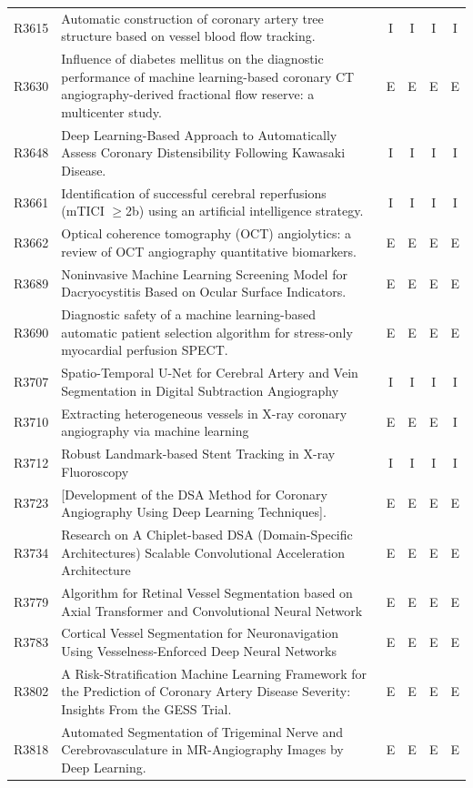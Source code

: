 \begin{longtable}{@{}l p{8.6cm} c c c c@{}}
R3615 & Automatic construction of coronary artery tree structure based on vessel blood flow tracking. & I & I & I & I \\
R3630 & Influence of diabetes mellitus on the diagnostic performance of machine learning-based coronary CT angiography-derived fractional flow reserve: a multicenter study. & E & E & E & E \\
R3648 & Deep Learning-Based Approach to Automatically Assess Coronary Distensibility Following Kawasaki Disease. & I & I & I & I \\
R3661 & Identification of successful cerebral reperfusions (mTICI $\geq$2b) using an artificial intelligence strategy. & I & I & I & I \\
R3662 & Optical coherence tomography (OCT) angiolytics: a review of OCT angiography quantitative biomarkers. & E & E & E & E \\
R3689 & Noninvasive Machine Learning Screening Model for Dacryocystitis Based on Ocular Surface Indicators. & E & E & E & E \\
R3690 & Diagnostic safety of a machine learning-based automatic patient selection algorithm for stress-only myocardial perfusion SPECT. & E & E & E & E \\
R3707 & Spatio-Temporal U-Net for Cerebral Artery and Vein Segmentation in Digital Subtraction Angiography & I & I & I & I \\
R3710 & Extracting heterogeneous vessels in X-ray coronary angiography via machine learning & E & E & E & I \\
R3712 & Robust Landmark-based Stent Tracking in X-ray Fluoroscopy & I & I & I & I \\
R3723 & [Development of the DSA Method for Coronary Angiography Using Deep Learning Techniques]. & E & E & E & E \\
R3734 & Research on A Chiplet-based DSA (Domain-Specific Architectures) Scalable Convolutional Acceleration Architecture & E & E & E & E \\
R3779 & Algorithm for Retinal Vessel Segmentation based on Axial Transformer and Convolutional Neural Network & E & E & E & E \\
R3783 & Cortical Vessel Segmentation for Neuronavigation Using Vesselness-Enforced Deep Neural Networks & E & E & E & E \\
R3802 & A Risk-Stratification Machine Learning Framework for the Prediction of Coronary Artery Disease Severity: Insights From the GESS Trial. & E & E & E & E \\
R3818 & Automated Segmentation of Trigeminal Nerve and Cerebrovasculature in MR-Angiography Images by Deep Learning. & E & E & E & E \\

\end{longtable}
